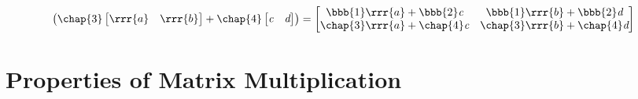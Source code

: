 \begin{itemize}
\begin{itemize}
\[\begin{pmatrix}
    \chap{3} \begin{bmatrix} \rrr{a} & \rrr{b} \end{bmatrix} + 
    \chap{4} \begin{bmatrix} \emph{c} & \emph{d} \end{bmatrix}
    \end{pmatrix}
    =
    \begin{bmatrix}
      \bbb{1}\rrr{a} + \bbb{2}\emph{c} & \bbb{1}\rrr{b}+\bbb{2}\emph{d} \\ \chap{3}\rrr{a}+\chap{4}\emph{c} & \chap{3}\rrr{b}+\chap{4}\emph{d} 
    \end{bmatrix}
  \]%
  \end{itemize}
\end{itemize}

\section{Properties of Matrix Multiplication}\label{Properties of Matrix Multiplication}
